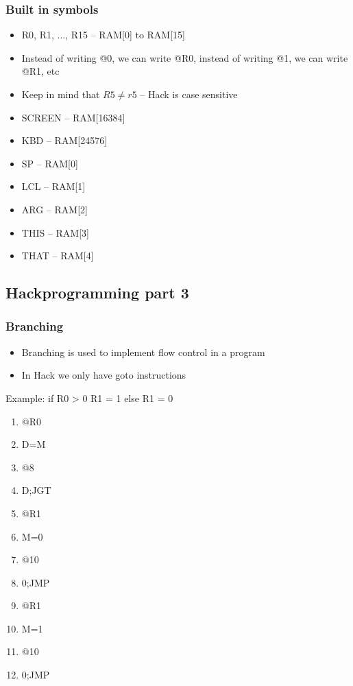 \documentclass[12pt,a4paper]{article}
\begin{document}
\subsubsection{Built in symbols}
\begin{itemize}
    \item R0, R1, ..., R15 -- RAM[0] to RAM[15]
    \item Instead of writing @0, we can write @R0, instead of writing @1, we can write @R1, etc
    \item Keep in mind that $R5 \neq r5$ -- Hack is case sensitive
    \item SCREEN -- RAM[16384]
    \item KBD -- RAM[24576]
    \item SP -- RAM[0]
    \item LCL -- RAM[1]
    \item ARG -- RAM[2]
    \item THIS -- RAM[3]
    \item THAT -- RAM[4]
\end{itemize}

\subsection{Hackprogramming part 3}
\subsubsection{Branching}
\begin{itemize}
    \item Branching is used to implement flow control in a program
    \item In Hack we only have goto instructions
\end{itemize}
Example: if R0 > 0 R1 = 1 else R1 = 0
\begin{enumerate}
    \item @R0
    \item D=M
    \item @8
    \item D;JGT
    \item @R1
    \item M=0
    \item @10
    \item 0;JMP
    \item @R1
    \item M=1
    \item @10
    \item 0;JMP
\end{enumerate}
\end{document}
